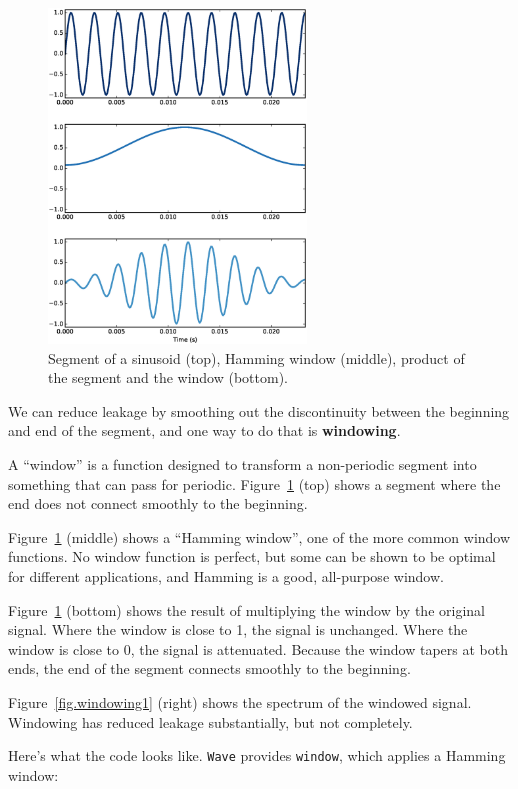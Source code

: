\documentclass[12pt]{book}
\begin{document}
\begin{figure}
\centerline{\includegraphics[height=3.5in]{figs/windowing2.eps}}
\caption{Segment of a sinusoid (top), Hamming window (middle), product
of the segment and the window (bottom).}
\label{fig.windowing2}
\end{figure}

We can reduce leakage by smoothing out the discontinuity between
the beginning and end of the segment, and one way to do that is
{\bf windowing}.

A ``window'' is a function designed to transform a non-periodic
segment into something that can pass for periodic.
Figure~\ref{fig.windowing2} (top) shows a segment where the end does not
connect smoothly to the beginning.

Figure~\ref{fig.windowing2} (middle) shows a ``Hamming window'', one of the
more common window functions.  No window function is perfect, but some
can be shown to be optimal for different applications, and Hamming
is a good, all-purpose window.

Figure~\ref{fig.windowing2} (bottom) shows the result of multiplying the
window by the original signal.  Where the window is close to 1, the
signal is unchanged.  Where the window is close to 0, the signal is
attenuated.  Because the window tapers at both ends, the end of the
segment connects smoothly to the beginning.

Figure~\ref{fig.windowing1} (right) shows the spectrum of the windowed
signal.  Windowing has reduced leakage substantially, but not
completely.

Here's what the code looks like.  {\tt Wave} provides {\tt window},
which applies a Hamming window:
\end{document}
